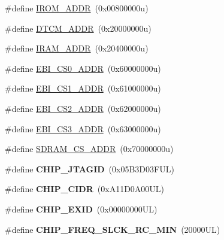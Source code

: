 \begin{DoxyCompactItemize}
\item 
\#define \mbox{\hyperlink{group__SAMS70J19__definitions_ga694212ffb8c2786bacee3d0ad6020bda}{I\+R\+O\+M\+\_\+\+A\+D\+DR}}~(0x00800000u)
\item 
\#define \mbox{\hyperlink{group__SAMS70J19__definitions_ga26626a425f7ebb3a0c2dbc276f0d9f78}{D\+T\+C\+M\+\_\+\+A\+D\+DR}}~(0x20000000u)
\item 
\#define \mbox{\hyperlink{group__SAMS70J19__definitions_gaae45ac2ef16942159481c767ac4805cf}{I\+R\+A\+M\+\_\+\+A\+D\+DR}}~(0x20400000u)
\item 
\#define \mbox{\hyperlink{group__SAMS70J19__definitions_ga9bcbb97ddae3b2cc5e2c9613d33f66b4}{E\+B\+I\+\_\+\+C\+S0\+\_\+\+A\+D\+DR}}~(0x60000000u)
\item 
\#define \mbox{\hyperlink{group__SAMS70J19__definitions_gaaddd9fdbbc77c9aced5308819f502a26}{E\+B\+I\+\_\+\+C\+S1\+\_\+\+A\+D\+DR}}~(0x61000000u)
\item 
\#define \mbox{\hyperlink{group__SAMS70J19__definitions_ga058a35f9991487dc2dd12ada792d0730}{E\+B\+I\+\_\+\+C\+S2\+\_\+\+A\+D\+DR}}~(0x62000000u)
\item 
\#define \mbox{\hyperlink{group__SAMS70J19__definitions_gad66ebdd0fc33ec3cf85dbaa14bbf05d9}{E\+B\+I\+\_\+\+C\+S3\+\_\+\+A\+D\+DR}}~(0x63000000u)
\item 
\#define \mbox{\hyperlink{group__SAMS70J19__definitions_ga61b7db25daf759c2a2beb6e5a0b57a84}{S\+D\+R\+A\+M\+\_\+\+C\+S\+\_\+\+A\+D\+DR}}~(0x70000000u)
\item 
\mbox{\label{group__SAMS70J19__definitions_gaa614519778eec0df55d3eeab3223e3f6}} 
\#define {\bfseries C\+H\+I\+P\+\_\+\+J\+T\+A\+G\+ID}~(0x05\+B3\+D03\+F\+U\+L)
\item 
\mbox{\label{group__SAMS70J19__definitions_ga1e1ae44dd9269a8a98c1d7e7a60e9fbd}} 
\#define {\bfseries C\+H\+I\+P\+\_\+\+C\+I\+DR}~(0x\+A11\+D0\+A00\+U\+L)
\item 
\mbox{\label{group__SAMS70J19__definitions_ga35123717aa86b76bb6b73cf3adc4c2e6}} 
\#define {\bfseries C\+H\+I\+P\+\_\+\+E\+X\+ID}~(0x00000000\+U\+L)
\item 
\mbox{\label{group__SAMS70J19__definitions_ga0e868bf27426399dfdcb3a9dfc3733c4}} 
\#define {\bfseries C\+H\+I\+P\+\_\+\+F\+R\+E\+Q\+\_\+\+S\+L\+C\+K\+\_\+\+R\+C\+\_\+\+M\+IN}~(20000\+U\+L)

\end{DoxyCompactItemize}
